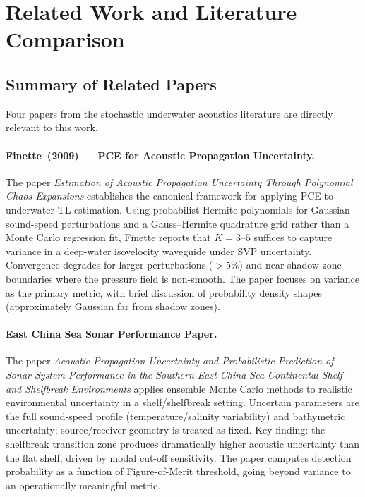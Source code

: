 \documentclass[11pt,a4paper]{article}
\begin{document}
\section{Related Work and Literature Comparison}
\label{sec:related}

\subsection{Summary of Related Papers}
\label{sec:papers}

Four papers from the stochastic underwater acoustics literature are directly
relevant to this work.

\paragraph{Finette~(2009) — PCE for Acoustic Propagation Uncertainty.}
The paper \emph{Estimation of Acoustic Propagation Uncertainty Through Polynomial
Chaos Expansions} establishes the canonical framework for applying PCE to
underwater TL estimation.
Using probabilist Hermite polynomials for Gaussian sound-speed perturbations
and a Gauss–Hermite quadrature grid rather than a Monte Carlo regression fit,
Finette reports that $K = 3$--$5$ suffices to capture variance in a deep-water
isovelocity waveguide under SVP uncertainty.
Convergence degrades for larger perturbations ($>$5\%) and near shadow-zone
boundaries where the pressure field is non-smooth.
The paper focuses on variance as the primary metric, with brief discussion of
probability density shapes (approximately Gaussian far from shadow zones).

\paragraph{East China Sea Sonar Performance Paper.}
The paper \emph{Acoustic Propagation Uncertainty and Probabilistic Prediction of
Sonar System Performance in the Southern East China Sea Continental Shelf and
Shelfbreak Environments} applies ensemble Monte Carlo methods to realistic
environmental uncertainty in a shelf/shelfbreak setting.
Uncertain parameters are the full sound-speed profile (temperature/salinity
variability) and bathymetric uncertainty; source/receiver geometry is treated
as fixed.
Key finding: the shelfbreak transition zone produces dramatically higher acoustic
uncertainty than the flat shelf, driven by modal cut-off sensitivity.
The paper computes detection probability as a function of Figure-of-Merit threshold,
going beyond variance to an operationally meaningful metric.
\end{document}
